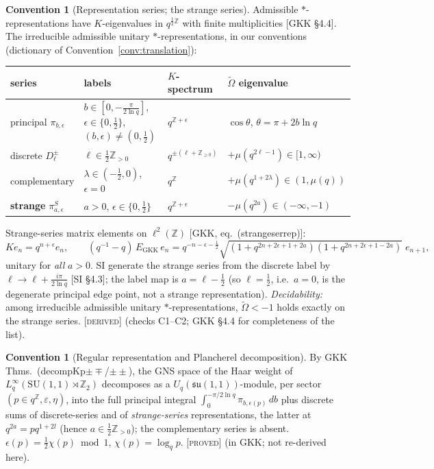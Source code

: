 \documentclass[11pt,a4paper]{article}
\newcommand{\PROVED}{{\color{ForestGreen}\textsc{[proved]}}}
\newcommand{\DERIVED}{{\color{teal}\textsc{[derived]}}}
\theoremstyle{definition}
\newtheorem{convention}[definition]{Convention}
\theoremstyle{plain}
\newcommand{\Uq}{U_q(\mathfrak{su}(1,1))}
\newcommand{\tCas}{\tilde\Omega}                %
\newcommand{\Z}{\mathbb{Z}}
\begin{document}
\begin{convention}[Representation series; the strange series]\label{conv:series}
Admissible $*$-representations have $K$-eigenvalues in $q^{\frac12\Z}$ with finite
multiplicities [GKK \S4.4]. The irreducible admissible unitary $*$-representations, in our
conventions (dictionary of Convention~\ref{conv:translation}):
\begin{center}
\begin{tabular}{llll}
\hline
series & labels & $K$-spectrum & $\tCas$ eigenvalue\\
\hline
principal $\pi_{b,\epsilon}$ & $b\in[0,-\tfrac{\pi}{2\ln q}]$, $\epsilon\in\{0,\tfrac12\}$,
$(b,\epsilon)\neq(0,\tfrac12)$ & $q^{\Z+\epsilon}$ & $\cos\theta$, $\theta=\pi+2b\ln q$\\
discrete $D^{\pm}_{\ell}$ & $\ell\in\tfrac12\Z_{>0}$ & $q^{\pm(\ell+\Z_{\ge0})}$ &
$+\mu(q^{2\ell-1})\in[1,\infty)$\\
complementary & $\lambda\in(-\tfrac12,0)$, $\epsilon=0$ & $q^{\Z}$ &
$+\mu(q^{1+2\lambda})\in(1,\mu(q))$\\
\textbf{strange} $\pi^{S}_{a,\epsilon}$ & $a>0$, $\epsilon\in\{0,\tfrac12\}$ & $q^{\Z+\epsilon}$ &
$-\mu(q^{2a})\in(-\infty,-1)$\\
\hline
\end{tabular}
\end{center}
Strange-series matrix elements on $\ell^{2}(\Z)$ [GKK, eq.\ (strangeserrep)]:
\begin{equation}\label{eq:strangematrixelements}
  K e_{n}=q^{n+\epsilon}e_{n},\qquad
  (q^{-1}-q)\,E_{\mathrm{GKK}}\,e_{n}
  =q^{-n-\epsilon-\frac12}\sqrt{(1+q^{2n+2\epsilon+1+2a})(1+q^{2n+2\epsilon+1-2a})}\;e_{n+1},
\end{equation}
unitary for \emph{all} $a>0$. SI generate the strange series from the discrete label by
$\ell\to\ell+\tfrac{i\pi}{2\ln q}$ [SI \S4.3]; the label map is $a=\ell-\tfrac12$
(so $\ell=\tfrac12$, i.e.\ $a=0$, is the degenerate principal edge point, not a strange
representation). \emph{Decidability:} among irreducible admissible unitary $*$-representations,
$\tCas<-1$ holds exactly on the strange series. \DERIVED{} (checks C1--C2; GKK \S4.4 for
completeness of the list).
\end{convention}

\begin{convention}[Regular representation and Plancherel decomposition]\label{conv:plancherel}
By GKK Thms.\ (decompKp$\pm\mp$/$\pm\pm$), the GNS space of the Haar weight of
$L^{\infty}_{q}(\mathrm{SU}(1,1)\rtimes\Z_2)$ decomposes as a $\Uq$-module, per sector
$(p\in q^{\Z},\varepsilon,\eta)$, into the full principal integral
$\int_{0}^{-\pi/2\ln q}\pi_{b,\epsilon(p)}\,db$ plus discrete sums of discrete-series and of
\emph{strange-series} representations, the latter at $q^{2a}=pq^{1+2l}$ (hence $a\in\tfrac12\Z_{>0}$);
the complementary series is absent. $\epsilon(p)=\tfrac12\chi(p)\bmod 1$, $\chi(p)=\log_{q}p$.
\PROVED{} (in GKK; not re-derived here).
\end{convention}
\end{document}
